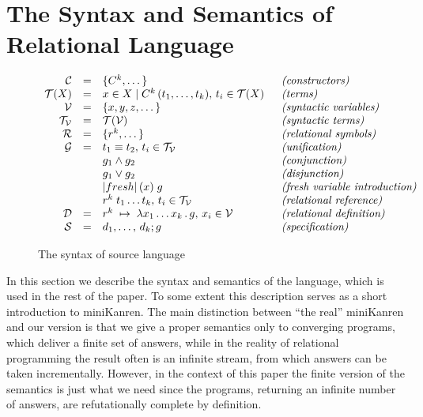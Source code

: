 \section{The Syntax and Semantics of Relational Language}

\begin{figure}[t]
$$
\begin{array}{rcll}
\meta{C}    & = & \{C^k,\dots\}                                        & \;\;\mbox{\emph{(constructors)}}\\
\meta{T}(X) & = & x\in X \mid C^k\,(t_1,\dots,t_k),\,t_i\in \meta{T}(X) & \;\;\mbox{\emph{(terms)}}\\
\meta{V}    & = & \{x, y, z, \dots\}                                   & \;\;\mbox{\emph{(syntactic variables)}}\\
\meta{T_V}  & = & \meta{T}(\meta{V})                                   & \;\;\mbox{\emph{(syntactic terms)}}\\
\meta{R}    & = & \{r^k,\dots\}                                        & \;\;\mbox{\emph{(relational symbols)}}\\
\meta{G}    & = & t_1\equiv t_2,\,t_i\in\meta{T_V}                      & \;\;\mbox{\emph{(unification)}}\\ 
            &   & g_1\wedge g_2                                        & \;\;\mbox{\emph{(conjunction)}}\\
            &   & g_1\vee g_2                                          & \;\;\mbox{\emph{(disjunction)}}\\
            &   &\lstinline|fresh|\,(x)\;g                             & \;\;\mbox{\emph{(fresh variable introduction)}}\\
            &   &r^k\;t_1\dots t_k,\,t_i\in\meta{T_V}                   & \;\;\mbox{\emph{(relational reference)}}\\
\meta{D}    & = & r^k\binds\lambda x_1\dots x_k\,.\,g,\,x_i\in\meta{V}  & \;\;\mbox{\emph{(relational definition)}}\\
\meta{S}    & = & d_1,\dots,\,d_k; g                                    & \;\;\mbox{\emph{(specification)}}
\end{array}
$$
\caption{The syntax of source language}
\label{syntax}
\end{figure}

In this section we describe the syntax and semantics of the language, which is used in the rest of the paper. To some extent this description serves as
a short introduction to miniKanren. The main distinction between ``the real'' miniKanren and our version is that we give a proper semantics only to converging programs, 
which deliver a finite set of answers, while in the reality of relational programming the result often is an infinite stream, from which answers can be taken incrementally. 
However, in the context of this paper the finite version of the semantics is just what we need since the programs, returning an infinite number of answers, are
refutationally complete by definition. %

